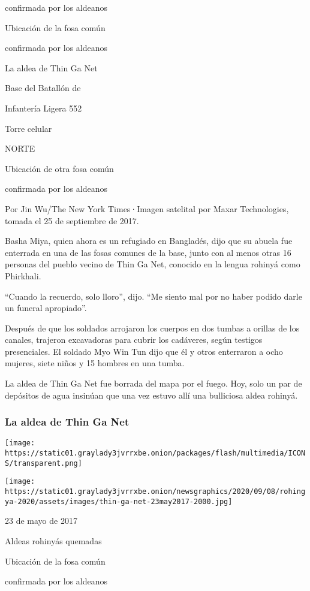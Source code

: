 confirmada por los aldeanos

Ubicación de la fosa común

confirmada por los aldeanos

La aldea de Thin Ga Net

Base del Batallón de

Infantería Ligera 552

Torre celular

NORTE

Ubicación de otra fosa común

confirmada por los aldeanos

Por Jin Wu/The New York Times·Imagen satelital por Maxar Technologies,
tomada el 25 de septiembre de 2017.

Basha Miya, quien ahora es un refugiado en Bangladés, dijo que su abuela
fue enterrada en una de las fosas comunes de la base, junto con al menos
otras 16 personas del pueblo vecino de Thin Ga Net, conocido en la
lengua rohinyá como Phirkhali.

``Cuando la recuerdo, solo lloro'', dijo. ``Me siento mal por no haber
podido darle un funeral apropiado''.

Después de que los soldados arrojaron los cuerpos en dos tumbas a
orillas de los canales, trajeron excavadoras para cubrir los cadáveres,
según testigos presenciales. El soldado Myo Win Tun dijo que él y otros
enterraron a ocho mujeres, siete niños y 15 hombres en una tumba.

La aldea de Thin Ga Net fue borrada del mapa por el fuego. Hoy, solo un
par de depósitos de agua insinúan que una vez estuvo allí una bulliciosa
aldea rohinyá.

\hypertarget{la-aldea-de-thin-ga-net}{%
\subsubsection{La aldea de Thin Ga Net}\label{la-aldea-de-thin-ga-net}}

\texttt{[image: https://static01.graylady3jvrrxbe.onion/packages/flash/multimedia/ICONS/transparent.png]}

\texttt{[image: https://static01.graylady3jvrrxbe.onion/newsgraphics/2020/09/08/rohingya-2020/assets/images/thin-ga-net-23may2017-2000.jpg]}

23 de mayo de 2017

Aldeas rohinyás quemadas

Ubicación de la fosa común

confirmada por los aldeanos

